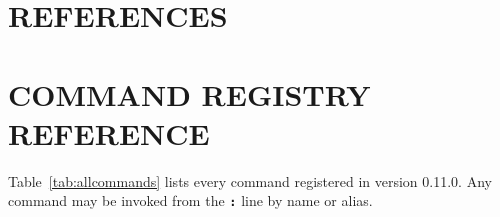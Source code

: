 \documentclass[tm]{ornltm}
\newcommand{\key}[1]{\textbf{\texttt{#1}}}
\begin{document}
\section{REFERENCES}
\printbibliography[heading=none]

\appendix
\acresetall

\section{COMMAND REGISTRY REFERENCE}
\label{sec:appcommands}

Table~\ref{tab:allcommands} lists every command registered in version 0.11.0.
Any command may be invoked from the \key{:} line by name or alias.
\end{document}
